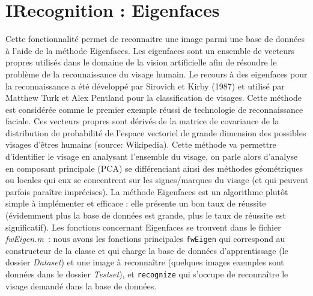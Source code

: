 \documentclass[12pt,a4paper]{article}
\begin{document}
\section{IRecognition : Eigenfaces}
Cette fonctionnalité permet de reconnaitre une image parmi une base de données à l'aide de la méthode Eigenfaces. Les eigenfaces sont un ensemble de vecteurs propres utilisés dans le domaine de la vision artificielle afin de résoudre le problème de la reconnaissance du visage humain. Le recours à des eigenfaces pour la reconnaissance a été développé par Sirovich et Kirby (1987) et utilisé par Matthew Turk et Alex Pentland pour la classification de visages. Cette méthode est considérée comme le premier exemple réussi de technologie de reconnaissance faciale. Ces vecteurs propres sont dérivés de la matrice de covariance de la distribution de probabilité de l'espace vectoriel de grande dimension des possibles visages d'êtres humains (source: Wikipedia). 
\newline
Cette méthode va permettre d'identifier le visage en analysant l'ensemble du visage, on parle alors d'analyse en composant principale (PCA) se différenciant ainsi des méthodes géométriques ou locales qui eux se concentrent sur les signes/marques du visage (et qui peuvent parfois paraître imprécises). La méthode Eigenfaces est un algorithme plutôt simple à implémenter et efficace : elle présente un bon taux de réussite (évidemment plus la base de données est grande, plus le taux de réussite est significatif).
\newline
Les fonctions concernant Eigenfaces se trouvent dans le fichier \textit{fwEigen.m} : nous avons les fonctions principales \texttt{fwEigen} qui correspond au constructeur de la classe et qui charge la base de données d'apprentissage (le dossier \textit{Dataset}) et une image à reconnaître (quelques images exemples sont données dans le dossier \textit{Testset}), et \texttt{recognize} qui s'occupe de reconnaître le visage demandé dans la base de données.
\end{document}
